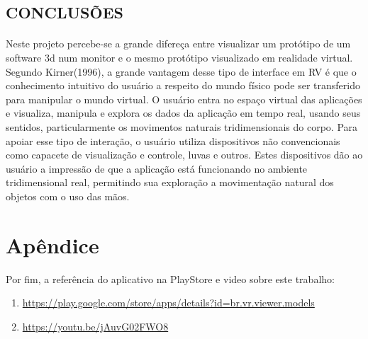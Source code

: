 \documentclass[12pt,a4paper]{article}
\begin{document}
\paragraph{}

\subsection{CONCLUSÕES}
\paragraph{}
Neste projeto percebe-se a grande difereça entre visualizar um protótipo de um software 3d num monitor e o mesmo protótipo visualizado em realidade virtual.
Segundo Kirner(1996), a grande vantagem desse tipo de interface em RV \cite{wiki:virtual_reality}  é
que o conhecimento intuitivo do usuário a respeito do mundo físico pode ser transferido para manipular o mundo virtual. O usuário entra no espaço virtual das aplicações e visualiza,
manipula e explora os dados da aplicação em tempo real, usando seus sentidos, particularmente os movimentos naturais tridimensionais do corpo. Para apoiar esse tipo de interação, o
usuário utiliza dispositivos não convencionais como capacete de visualização e controle, luvas e outros. Estes dispositivos dão ao usuário a impressão de que a aplicação está funcionando
no ambiente tridimensional real, permitindo sua exploração a movimentação natural dos objetos com o uso das mãos.

\newpage
\section{Apêndice}

Por fim, a referência do aplicativo na PlayStore e video sobre este trabalho:

\begin{enumerate}
\item  \url{https://play.google.com/store/apps/details?id=br.vr.viewer.models} \cite{playstore:app_vr_viewer_prototypes}
\item  \url{https://youtu.be/jAuvG02FWO8} \cite{youtube:app_vr_viewer_prototypes}
\end{enumerate}




 
\end{document}

